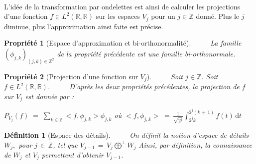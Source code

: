 \documentclass[a4paper,10pt]{report}
\theoremstyle{break}
\newtheorem{Def}{D\'{e}finition}
\newtheorem{Prop}{Propri\'{e}t\'{e}}
\begin{document}
    \paragraph{} L'id\'{e}e de la transformation par ondelettes est ainsi de calculer les projections d'une fonction
	$ f \in L^2(\mathbb{R}, \mathbb{R}) $ sur les espaces $ V_j $ pour un $ j \in \mathbb{Z} $ donn\'{e}.
	Plus le $ j $ diminue, plus l'approximation ainsi faite est pr\'{e}cise.

    \begin{Prop}[Espace d'approximation et bi-orthonormalit\'{e}]
	$\phantom{Prop}$ La famille $ (\phi_{j,k})_{ (j, k) \in \mathbb{Z}^2 } $ de la propri\'{e}t\'{e} pr\'{e}c\'{e}dente 
	est une famille bi-orthonormale.
    \end{Prop}
 
\newpage
	
    \begin{Prop}[Projection d'une fonction sur $V_j$]
	$\phantom{Prop}$ Soit $ j \in \mathbb{Z} $. Soit $ f \in L^2(\mathbb{R}, \mathbb{R}) $. \newline
	$\phantom{Prop}$ D'apr\`{e}s les deux propri\'{e}t\'{e}s pr\'{e}c\'{e}dentes, la projection de $f$ sur $ V_j $ est donn\'{e}e par : 
	\begin{center}
	  $P_{V_j}(f) \; = \; \displaystyle\sum_{k \in \mathbb{Z}} <f, \phi_{j,k}> \phi_{j,k} $ \newline
	  o\`{u} $ <f, \phi_{j,k}> \; = \, \frac{1}{\sqrt{2^j}} \int_{2^j k}^{2^j (k \, + \, 1)} f(t) \, \mathrm{d} t $
	\end{center}
    \end{Prop}
	
    \begin{Def}[Espace des d\'{e}tails]
	$\phantom{Prop}$ On d\'{e}finit la notion d'espace de d\'{e}tails $ W_j , $ pour $ j \, \in \, \mathbb{Z} $, tel que \newline
	$ V_{j - 1} \, = \, V_j \displaystyle \bigoplus^\perp W_j $ \newline
	Ainsi, par d\'{e}finition, la connaissance de $ W_j $ et $ V_j $ permettent d'obtenir $ V_{j - 1} $.
    \end{Def}
	
\end{document}
